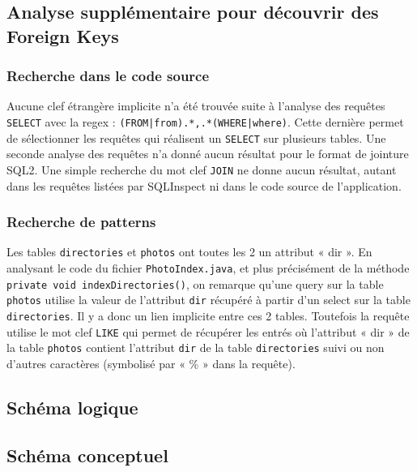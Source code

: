 \subsection{Analyse supplémentaire pour découvrir des Foreign Keys}
\subsubsection{Recherche dans le code source}
Aucune clef étrangère implicite n'a été trouvée suite à l'analyse des requêtes \texttt{SELECT} avec la regex : \texttt{(FROM|from).*,.*(WHERE|where)}. Cette dernière permet de sélectionner les requêtes qui réalisent un \texttt{SELECT} sur plusieurs tables.
Une seconde analyse des requêtes n'a donné aucun résultat pour le format de jointure SQL2. Une simple recherche du mot clef \texttt{JOIN} ne donne aucun résultat, autant dans les requêtes listées par SQLInspect ni dans le code source de l'application.

\subsubsection{Recherche de patterns}
Les tables \texttt{directories} et \texttt{photos} ont toutes les 2 un attribut « dir ». En analysant le code du fichier \texttt{PhotoIndex.java}, et plus précisément de la méthode\\\texttt{private void indexDirectories()}, on remarque qu'une query sur la table \texttt{photos} utilise la valeur de l'attribut \texttt{dir} récupéré à partir d'un select sur la table \texttt{directories}. Il y a donc un lien implicite entre ces 2 tables. Toutefois la requête utilise le mot clef \texttt{LIKE} qui permet de récupérer les entrés où l'attribut « dir » de la table \texttt{photos} contient l'attribut \texttt{dir} de la table \texttt{directories} suivi ou non d'autres caractères (symbolisé par « \% » dans la requête).

\subsection{Schéma logique}

\subsection{Schéma conceptuel}

